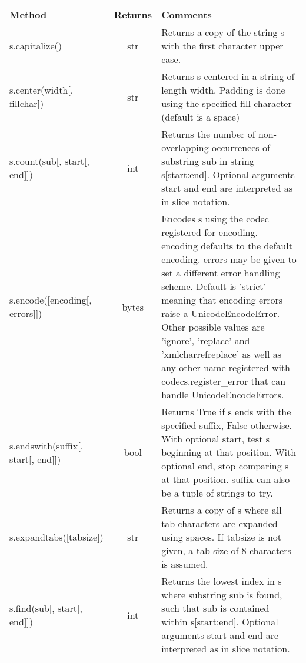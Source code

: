 \begin{center}
{\small
\begin{tabular}{|l|c|p{2.2in}|} \hline
{\bf Method} & {\bf Returns} & {\bf Comments} \\ \hline\hline  
    s.capitalize() & str
 &      
       Returns a copy of the string s with the first character upper case. 
\\ \hline
       s.center(width[, fillchar]) & str
 &    
       Returns s centered in a string of   length width. Padding is
       done using the   specified fill character (default is a   space)
\\ \hline
       s.count(sub[, start[, end]]) & int
 &      
       Returns the number of non-overlapping   
       occurrences of substring sub in   
       string s[start:end].  Optional arguments   
       start and end are
       interpreted as in slice   
       notation.
\\ \hline
       s.encode([encoding[, errors]]) & bytes
&      
       Encodes s using the codec registered  
       for encoding. encoding defaults to the   
       default encoding. errors may be given  
       to set a different error
       handling scheme.   
       Default is 'strict' meaning that encoding   
       errors raise
       a UnicodeEncodeError.   
       Other possible values are 'ignore',   
       'replace' and
       'xmlcharrefreplace' as  well  
       as any other name registered with   
       codecs.register\_error that can  handle   
      UnicodeEncodeErrors.    
\\ \hline
       s.endswith(suffix[, start[, end]]) & bool
 &      
       Returns True if s ends with the specified suffix, False otherwise.
       With optional start, test s beginning at that position.
       With optional end, stop comparing s at that position.
       suffix can also be a tuple of strings to try.
\\ \hline   
      s.expandtabs([tabsize]) & str
&      
       Returns a copy of s where all tab characters are expanded using spaces.
       If tabsize is not given, a tab size of 8 characters is assumed.   
\\ \hline
       s.find(sub[, start[, end]]) & int
&    
       Returns the lowest index in s where substring sub is found,
       such that sub is contained within s[start:end].  Optional
       arguments start and end are interpreted as in slice notation.
       

\end{tabular}}
\end{center}

